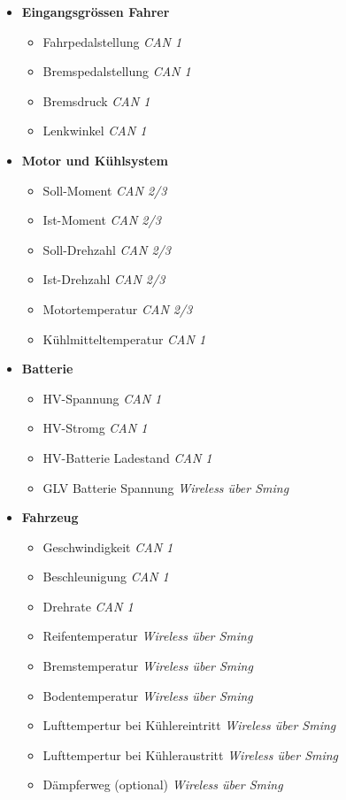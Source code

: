 \begin{itemize}
	\itemsep 1pt \parskip 0pt \parsep 0pt
	\item \textbf{Eingangsgrössen Fahrer}		
		\begin{itemize}
			\itemsep 1pt \parskip 0pt \parsep 0pt
			\item Fahrpedalstellung		\textit{CAN 1}
			\item Bremspedalstellung	\textit{CAN 1}
			\item Bremsdruck			\textit{CAN 1}
			\item Lenkwinkel			\textit{CAN 1}
		\end{itemize}
	\item \textbf{Motor und Kühlsystem}		
		\begin{itemize}
			\itemsep 1pt \parskip 0pt \parsep 0pt
			\item Soll-Moment			\textit{CAN 2/3}
			\item Ist-Moment			\textit{CAN 2/3}
			\item Soll-Drehzahl			\textit{CAN 2/3}
			\item Ist-Drehzahl			\textit{CAN 2/3}
			\item Motortemperatur		\textit{CAN 2/3}
			\item Kühlmitteltemperatur	\textit{CAN 1}
		\end{itemize}		
	\item \textbf{Batterie}		
		\begin{itemize}
			\itemsep 1pt \parskip 0pt \parsep 0pt
			\item HV-Spannung				\textit{CAN 1}
			\item HV-Stromg					\textit{CAN 1}
			\item HV-Batterie Ladestand		\textit{CAN 1}
			\item GLV Batterie Spannung		\textit{Wireless über Sming}
		\end{itemize}
					
	\item \textbf{Fahrzeug}		
	\begin{itemize}
		\itemsep 1pt \parskip 0pt \parsep 0pt
		\item Geschwindigkeit						\textit{CAN 1}
		\item Beschleunigung						\textit{CAN 1}
		\item Drehrate 								\textit{CAN 1}
		\item Reifentemperatur						\textit{Wireless über Sming}
		\item Bremstemperatur						\textit{Wireless über Sming}
		\item Bodentemperatur						\textit{Wireless über Sming}
		\item Lufttempertur bei Kühlereintritt		\textit{Wireless über Sming}
		\item Lufttempertur bei Kühleraustritt		\textit{Wireless über Sming}
		\item Dämpferweg (optional)					\textit{Wireless über Sming}
		
	\end{itemize}			
\end{itemize}


